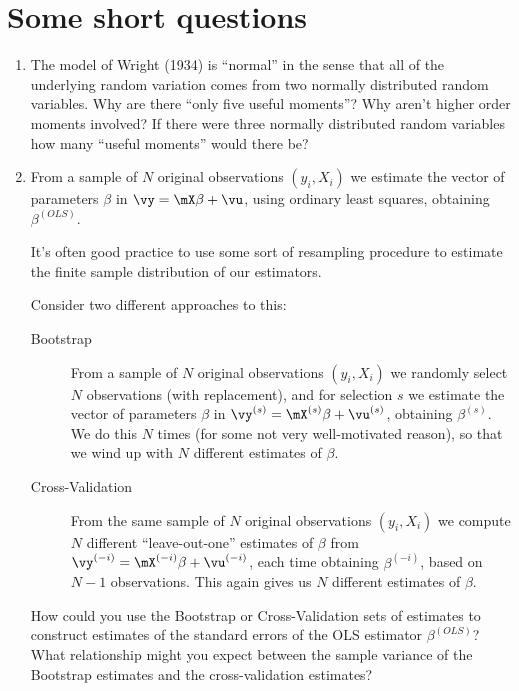 \documentclass[12pt]{amsart}
\begin{document}
\section{Some short questions}
\label{sec:org4757ca0}
\begin{enumerate}
\item The model of Wright (1934) is ``normal'' in the sense that all of
the underlying random variation comes from two normally
distributed random variables.  Why are there ``only five useful
moments''? Why aren’t higher order moments involved?  If there
were three normally distributed random variables how many ``useful
moments'' would there be?

\item From a sample of \(N\) original observations \((y_i,X_i)\) we
estimate the vector of parameters \(\beta\) in
\(\vy = \mX\beta + \vu\), using ordinary least squares, obtaining
\(\beta^{(OLS)}\).  

It's often good practice to use some sort of resampling procedure
to estimate the finite sample distribution of our estimators.

Consider two different approaches to this:
\begin{description}
\item[{Bootstrap}] From a sample of \(N\) original observations \((y_i,X_i)\) we
 randomly select \(N\) observations (with replacement), and for
 selection \(s\) we estimate the vector of parameters \(\beta\) in
 \(\vy^{(s)} = \mX^{(s)}\beta + \vu^{(s)}\), obtaining
 \(\beta^{(s)}\).  We do this \(N\) times (for some not very
well-motivated reason), so that we wind up with \(N\) different
estimates of \(\beta\).
\item[{Cross-Validation}] From the same sample of \(N\) original observations \((y_i,X_i)\) we
 compute \(N\) different ``leave-out-one'' estimates of \(\beta\) from
 \(\vy^{(-i)} = \mX^{(-i)}\beta + \vu^{(-i)}\), each time obtaining
 \(\beta^{(-i)}\), based on \(N-1\) observations.  This again gives
us \(N\) different estimates of \(\beta\).
\end{description}

How could you use the Bootstrap or Cross-Validation sets of
estimates to construct estimates of the standard errors of the
OLS estimator \(\beta^{(OLS)}\)?  What  relationship might you
expect between the sample variance of the Bootstrap estimates and
the cross-validation estimates?


\end{enumerate}
\end{document}
